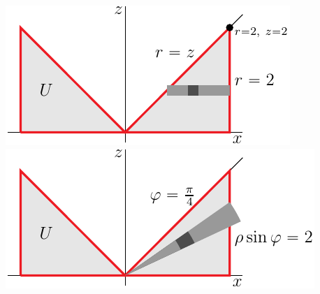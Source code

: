 \begin{solution}
\begin{center}
     \includegraphics[scale=0.9]{fig/OE07A_8c.pdf}\quad
     \includegraphics[scale=0.9]{fig/OE07A_8s.pdf}
\end{center}


\end{solution}
